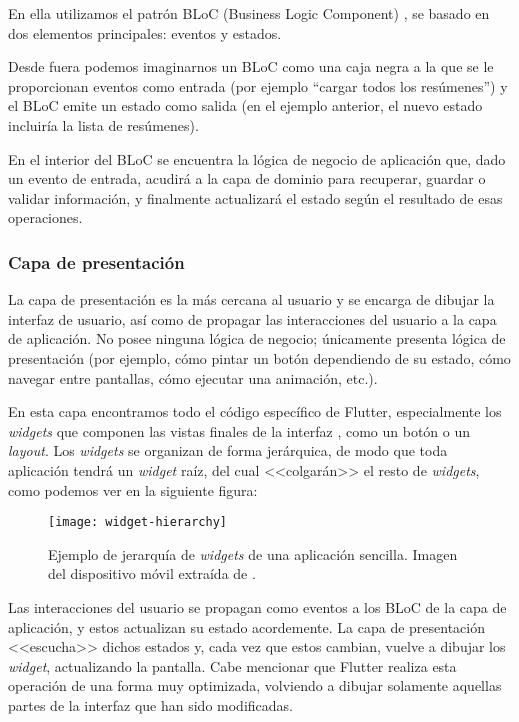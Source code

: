 En ella utilizamos el patrón BLoC (Business Logic Component) \cite{miola20}, se basado en dos elementos principales: eventos y estados.

Desde fuera podemos imaginarnos un BLoC como una caja negra a la que se le proporcionan eventos como entrada (por ejemplo ``cargar todos los resúmenes'') y el BLoC emite un estado como salida (en el ejemplo anterior, el nuevo estado incluiría la lista de resúmenes).

En el interior del BLoC se encuentra la lógica de negocio de aplicación que, dado un evento de entrada, acudirá a la capa de dominio para recuperar, guardar o validar información, y finalmente actualizará el estado según el resultado de esas operaciones.

\subsubsection{Capa de presentación}

La capa de presentación es la más cercana al usuario y se encarga de dibujar la interfaz de usuario, así como de propagar las interacciones del usuario a la capa de aplicación. No posee ninguna lógica de negocio; únicamente presenta lógica de presentación (por ejemplo, cómo pintar un botón dependiendo de su estado, cómo navegar entre pantallas, cómo ejecutar una animación, etc.).

En esta capa encontramos todo el código específico de Flutter, especialmente los \emph{widgets} que componen las vistas finales de la interfaz \cite{flutter-widget}, como un botón o un \emph{layout}. Los \emph{widgets} se organizan de forma jerárquica, de modo que toda aplicación tendrá un \emph{widget} raíz, del cual <<colgarán>> el resto de \emph{widgets}, como podemos ver en la siguiente figura:

\begin{figure}[h!]
	\centering
	\texttt{[image: widget-hierarchy]}
	\caption[Ejemplo de jerarquía de \emph{widgets}.]{Ejemplo de jerarquía de \emph{widgets} de una aplicación sencilla. Imagen del dispositivo móvil extraída de \cite{miola20}.}
	\label{flutter-widgets}
\end{figure}

Las interacciones del usuario se propagan como eventos a los BLoC de la capa de aplicación, y estos actualizan su estado acordemente. La capa de presentación <<escucha>> dichos estados y, cada vez que estos cambian, vuelve a dibujar los \emph{widget}, actualizando la pantalla. Cabe mencionar que Flutter realiza esta operación de una forma muy optimizada, volviendo a dibujar solamente aquellas partes de la interfaz que han sido modificadas.


